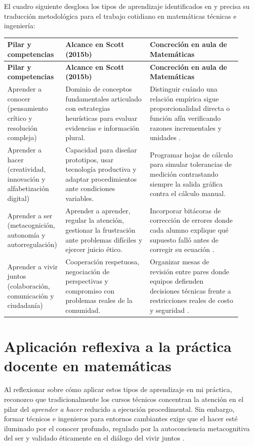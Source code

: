 \documentclass[spanish,letterpaper,oneside]{article}
\begin{document}
El cuadro siguiente desglosa los tipos de aprendizaje identificados en \citet{scott2015futuro2} y precisa su traducción metodológica para el trabajo cotidiano en matemáticas técnicas e ingeniería:

{\small{}\renewcommand{\arraystretch}{1.32}
\begin{longtable}{|>{\raggedright\arraybackslash}p{0.21\linewidth}|>{\raggedright\arraybackslash}p{0.35\linewidth}|>{\raggedright\arraybackslash}p{0.38\linewidth}|}\hline
\rowcolor{iiiepePale} \textbf{Pilar y competencias} & \textbf{Alcance en Scott (2015b)} & \textbf{Concreción en aula de Matemáticas} \\\hline
\endfirsthead
\hline
\rowcolor{iiiepePale} \textbf{Pilar y competencias} & \textbf{Alcance en Scott (2015b)} & \textbf{Concreción en aula de Matemáticas} \\\hline
\endhead
Aprender a conocer (pensamiento crítico y resolución compleja) & Dominio de conceptos fundamentales articulado con estrategias heurísticas para evaluar evidencias e información plural. & Distinguir cuándo una relación empírica sigue proporcionalidad directa o función afín verificando razones incrementales y unidades \citep{sawyer2008optimizing}. \\\hline
Aprender a hacer (creatividad, innovación y alfabetización digital) & Capacidad para diseñar prototipos, usar tecnología productiva y adaptar procedimientos ante condiciones variables. & Programar hojas de cálculo para simular tolerancias de medición contrastando siempre la salida gráfica contra el cálculo manual. \\\hline
Aprender a ser (metacognición, autonomía y autorregulación) & Aprender a aprender, regular la atención, gestionar la frustración ante problemas difíciles y ejercer juicio ético. & Incorporar bitácoras de corrección de errores donde cada alumno explique qué supuesto falló antes de corregir su ecuación \citep{eef2021feedback}. \\\hline
Aprender a vivir juntos (colaboración, comunicación y ciudadanía) & Cooperación respetuosa, negociación de perspectivas y compromiso con problemas reales de la comunidad. & Organizar mesas de revisión entre pares donde equipos defienden decisiones técnicas frente a restricciones reales de costo y seguridad \citep{sep2023pensamiento}. \\\hline
\end{longtable}}

\section{Aplicación reflexiva a la práctica docente en matemáticas}
Al reflexionar sobre cómo aplicar estos tipos de aprendizaje en mi práctica, reconozco que tradicionalmente los cursos técnicos concentran la atención en el pilar del \textit{aprender a hacer} reducido a ejecución procedimental. Sin embargo, formar técnicos e ingenieros para entornos cambiantes exige que el hacer esté iluminado por el conocer profundo, regulado por la autoconciencia metacognitiva del ser y validado éticamente en el diálogo del vivir juntos \citep{scott2015futuro2,pimienta2012estrategias}.
\end{document}
